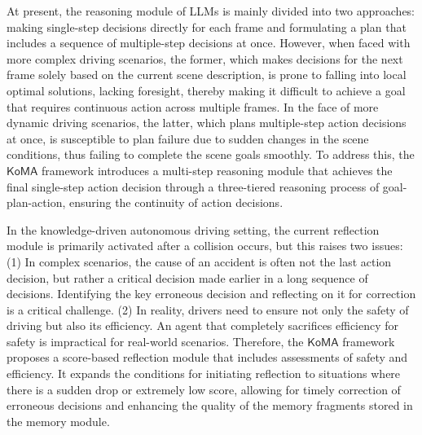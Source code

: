 \documentclass[lettersize,journal]{IEEEtran}
\begin{document}

At present, the reasoning module of LLMs is mainly divided into two approaches: making single-step decisions directly for each frame\cite{wendilu} and formulating a plan that includes a sequence of multiple-step decisions at once\cite{cui2024receive}. However, when faced with more complex driving scenarios, the former, which makes decisions for the next frame solely based on the current scene description, is prone to falling into local optimal solutions, lacking foresight, thereby making it difficult to achieve a goal that requires continuous action across multiple frames. In the face of more dynamic driving scenarios, the latter, which plans multiple-step action decisions at once, is susceptible to plan failure due to sudden changes in the scene conditions, thus failing to complete the scene goals smoothly. To address this, the $\mathsf{KoMA}$ framework introduces a multi-step reasoning module that achieves the final single-step action decision through a three-tiered reasoning process of goal-plan-action, ensuring the continuity of action decisions. 

In the knowledge-driven autonomous driving setting, the current reflection module is primarily activated after a collision occurs\cite{wendilu, li2023towards}, but this raises two issues: (1) In complex scenarios, the cause of an accident is often not the last action decision, but rather a critical decision made earlier in a long sequence of decisions. Identifying the key erroneous decision and reflecting on it for correction is a critical challenge. (2) In reality, drivers need to ensure not only the safety of driving but also its efficiency. An agent that completely sacrifices efficiency for safety is impractical for real-world scenarios. Therefore, the $\mathsf{KoMA}$ framework proposes a score-based reflection module that includes assessments of safety and efficiency. It expands the conditions for initiating reflection to situations where there is a sudden drop or extremely low score, allowing for timely correction of erroneous decisions and enhancing the quality of the memory fragments stored in the memory module.
\end{document}
